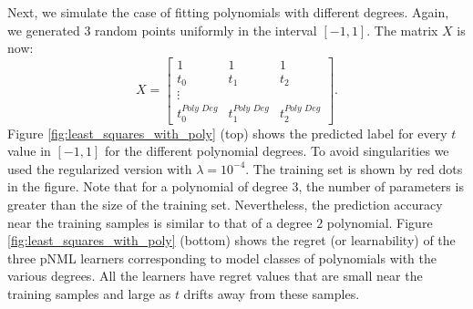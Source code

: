 \documentclass[conference,letterpaper]{IEEEtran}
\begin{document}
Next, we simulate the case of fitting polynomials with different degrees. Again, we generated 3 random points uniformly in the interval $[-1, 1]$.
The matrix $X$ is now:
\begin{equation}
X = 
\begin{bmatrix}
1 & 1 & 1 \\
t_0 & t_1 & t_2 \\
\vdots \\
t_0^{\textit{Poly Deg}} & t_1^{\textit{Poly Deg}} & t_2^{\textit{Poly Deg}} 
\end{bmatrix}.
\end{equation}
Figure \ref{fig:least_squares_with_poly} (top) shows the predicted label for every $t$ value in $[-1,1]$ for the different polynomial degrees. To avoid singularities we used the regularized version with $\lambda=10^{-4}$. The training set is shown by red dots in the figure. 
Note that for a polynomial of degree $3$, the number of parameters is greater than the size of the training set. Nevertheless, the prediction accuracy near the training samples is similar to that of a degree $2$ polynomial.
Figure \ref{fig:least_squares_with_poly} (bottom) shows the regret (or learnability) of the three pNML learners corresponding to model classes of polynomials with the various degrees. All the learners have regret values that are small near the training samples and large as $t$ drifts away from these samples.
\end{document}
